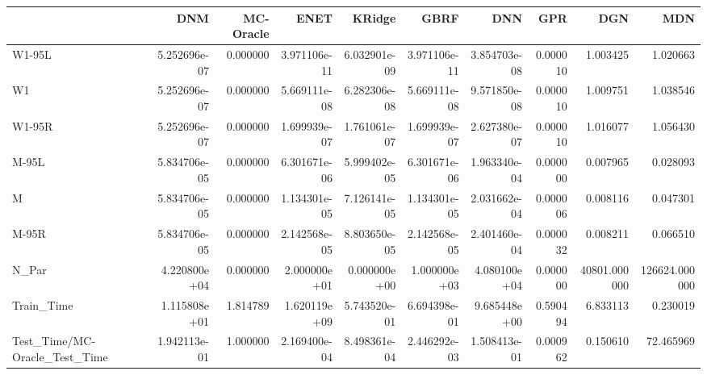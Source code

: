 \begin{tabular}{lrrrrrrrrr}
\toprule
{} &           DNM &  MC-Oracle &          ENET &        KRidge &          GBRF &           DNN &       GPR &           DGN &            MDN \\
\midrule
W1-95L                        &  5.252696e-07 &   0.000000 &  3.971106e-11 &  6.032901e-09 &  3.971106e-11 &  3.854703e-08 &  0.000010 &      1.003425 &       1.020663 \\
W1                            &  5.252696e-07 &   0.000000 &  5.669111e-08 &  6.282306e-08 &  5.669111e-08 &  9.571850e-08 &  0.000010 &      1.009751 &       1.038546 \\
W1-95R                        &  5.252696e-07 &   0.000000 &  1.699939e-07 &  1.761061e-07 &  1.699939e-07 &  2.627380e-07 &  0.000010 &      1.016077 &       1.056430 \\
M-95L                         &  5.834706e-05 &   0.000000 &  6.301671e-06 &  5.999402e-05 &  6.301671e-06 &  1.963340e-04 &  0.000000 &      0.007965 &       0.028093 \\
M                             &  5.834706e-05 &   0.000000 &  1.134301e-05 &  7.126141e-05 &  1.134301e-05 &  2.031662e-04 &  0.000006 &      0.008116 &       0.047301 \\
M-95R                         &  5.834706e-05 &   0.000000 &  2.142568e-05 &  8.803650e-05 &  2.142568e-05 &  2.401460e-04 &  0.000032 &      0.008211 &       0.066510 \\
N\_Par                         &  4.220800e+04 &   0.000000 &  2.000000e+01 &  0.000000e+00 &  1.000000e+03 &  4.080100e+04 &  0.000000 &  40801.000000 &  126624.000000 \\
Train\_Time                    &  1.115808e+01 &   1.814789 &  1.620119e+09 &  5.743520e-01 &  6.694398e-01 &  9.685448e+00 &  0.590494 &      6.833113 &       0.230019 \\
Test\_Time/MC-Oracle\_Test\_Time &  1.942113e-01 &   1.000000 &  2.169400e-04 &  8.498361e-04 &  2.446292e-03 &  1.508413e-01 &  0.000962 &      0.150610 &      72.465969 \\
\bottomrule
\end{tabular}
